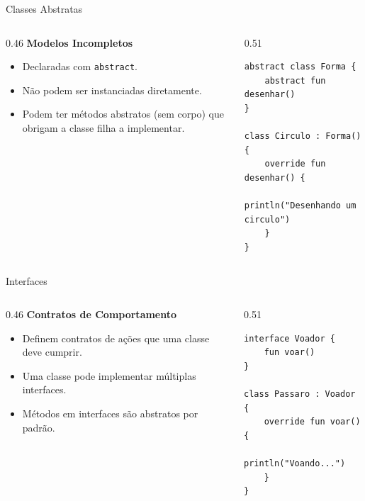 \documentclass[aspectratio=169]{beamer}
\begin{document}
\begin{frame}[fragile]{Classes Abstratas}
  \begin{columns}[T]
    \begin{column}{0.46\textwidth}
      \textbf{Modelos Incompletos}
      \vspace{0.3em}
      \begin{itemize}\small
        \item Declaradas com \texttt{abstract}.
        \item Não podem ser instanciadas diretamente.
        \item Podem ter métodos abstratos (sem corpo) que obrigam a classe filha a implementar.
      \end{itemize}
    \end{column}
    \begin{column}{0.51\textwidth}
\begin{lstlisting}[style=KotlinStyle]
abstract class Forma {
    abstract fun desenhar()
}

class Circulo : Forma() {
    override fun desenhar() {
        println("Desenhando um circulo")
    }
}
\end{lstlisting}
    \end{column}
  \end{columns}
\end{frame}

\begin{frame}[fragile]{Interfaces}
  \begin{columns}[T]
    \begin{column}{0.46\textwidth}
      \textbf{Contratos de Comportamento}
      \vspace{0.3em}
      \begin{itemize}\small
        \item Definem contratos de ações que uma classe deve cumprir.
        \item Uma classe pode implementar múltiplas interfaces.
        \item Métodos em interfaces são abstratos por padrão.
      \end{itemize}
    \end{column}
    \begin{column}{0.51\textwidth}
\begin{lstlisting}[style=KotlinStyle]
interface Voador {
    fun voar()
}

class Passaro : Voador {
    override fun voar() {
        println("Voando...")
    }
}
\end{lstlisting}
    \end{column}
  \end{columns}
\end{frame}
\end{document}
